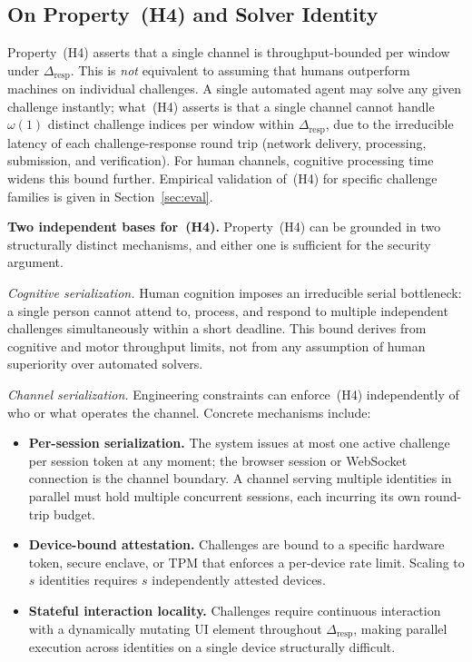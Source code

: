 \documentclass[11pt]{article}
\theoremstyle{remark}
\theoremstyle{plain}
\begin{document}
	\subsection{On Property~(H4) and Solver Identity}
	
	Property~(H4) asserts that a single channel is throughput-bounded per
	window under $\Delta_{\mathrm{resp}}$. This is \emph{not} equivalent to
	assuming that humans outperform machines on individual challenges. A single
	automated agent may solve any given challenge instantly; what~(H4) asserts
	is that a single channel cannot handle $\omega(1)$ distinct challenge
	indices per window within $\Delta_{\mathrm{resp}}$, due to the irreducible
	latency of each challenge-response round trip (network delivery, processing,
	submission, and verification). For human channels, cognitive processing
	time widens this bound further. Empirical validation of~(H4) for specific
	challenge families is given in Section~\ref{sec:eval}.
	
	\noindent\textbf{Two independent bases for~(H4).}
	Property~(H4) can be grounded in two structurally distinct mechanisms,
	and either one is sufficient for the security argument.
	
	\emph{Cognitive serialization.}
	Human cognition imposes an irreducible serial bottleneck: a single person
	cannot attend to, process, and respond to multiple independent challenges
	simultaneously within a short deadline. This bound derives from cognitive
	and motor throughput limits, not from any assumption of human superiority
	over automated solvers.
	
	\emph{Channel serialization.}
	Engineering constraints can enforce~(H4) independently of who or what
	operates the channel. Concrete mechanisms include:
	\begin{itemize}
		\item \textbf{Per-session serialization.} The system issues at most
		one active challenge per session token at any moment; the browser
		session or WebSocket connection is the channel boundary. A channel
		serving multiple identities in parallel must hold multiple concurrent
		sessions, each incurring its own round-trip budget.
		\item \textbf{Device-bound attestation.} Challenges are bound to
		a specific hardware token, secure enclave, or TPM that enforces
		a per-device rate limit. Scaling to $s$ identities requires $s$
		independently attested devices.
		\item \textbf{Stateful interaction locality.} Challenges require
		continuous interaction with a dynamically mutating UI element
		throughout $\Delta_{\mathrm{resp}}$, making parallel execution across
		identities on a single device structurally difficult.
	\end{itemize}
	
\end{document}
